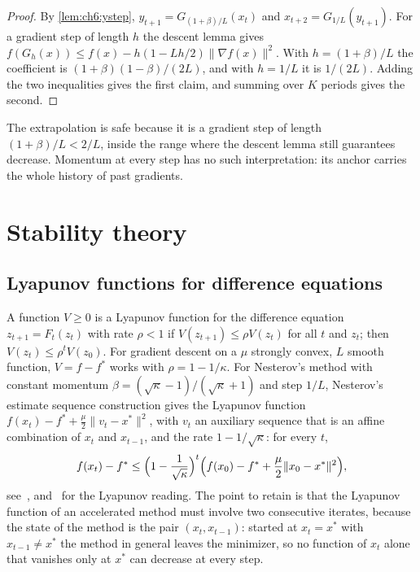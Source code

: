 \begin{proof}
By \cref{lem:ch6:ystep}, $y_{t+1}=G_{(1+\beta)/L}(x_t)$ and
$x_{t+2}=G_{1/L}(y_{t+1})$. For a gradient step of length $h$ the descent lemma
gives $f(G_h(x))\le f(x)-h(1-Lh/2)\|\nabla f(x)\|^2$. With $h=(1+\beta)/L$ the
coefficient is $(1+\beta)(1-\beta)/(2L)$, and with $h=1/L$ it is $1/(2L)$. Adding
the two inequalities gives the first claim, and summing over $K$ periods gives
the second.
\end{proof}

The extrapolation is safe because it is a gradient step of length
$(1+\beta)/L<2/L$, inside the range where the descent lemma still guarantees
decrease. Momentum at every step has no such interpretation: its anchor
carries the whole history of past gradients.

\section{Stability theory}\label{sec:ch5b:stability}

\subsection{Lyapunov functions for difference equations}

A function $V\ge0$ is a Lyapunov function for the difference equation
$z_{t+1}=F_t(z_t)$ with rate $\rho<1$ if $V(z_{t+1})\le\rho V(z_t)$ for all $t$
and $z_t$; then $V(z_t)\le\rho^tV(z_0)$. For gradient descent on a $\mu$ strongly
convex, $L$ smooth function, $V=f-f^*$ works with $\rho=1-1/\kappa$. For
Nesterov's method with constant momentum $\beta=(\sqrt\kappa-1)/(\sqrt\kappa+1)$
and step $1/L$, Nesterov's estimate sequence construction gives the Lyapunov
function $f(x_t)-f^*+\frac\mu2\|v_t-x^*\|^2$, with $v_t$ an auxiliary sequence that
is an affine combination of $x_t$ and $x_{t-1}$, and the rate
$1-1/\sqrt\kappa$: for every $t$,
\[
  f(x_t)-f^*\le\Bigl(1-\frac1{\sqrt\kappa}\Bigr)^t\Bigl(f(x_0)-f^*
  +\frac\mu2\|x_0-x^*\|^2\Bigr),
\]
see~\cite{nesterov2004}, and~\cite{wilson2021} for the Lyapunov reading.
The point to retain is that the Lyapunov function of an accelerated method must involve two consecutive iterates, because the state of the method is the pair $(x_t,x_{t-1})$: started at $x_t=x^*$ with $x_{t-1}\ne x^*$ the method in general leaves the minimizer, so no function of $x_t$ alone that vanishes only at $x^*$ can decrease at every step.


